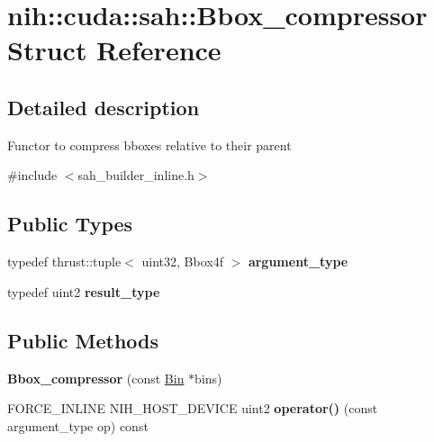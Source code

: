 \hypertarget{structnih_1_1cuda_1_1sah_1_1_bbox__compressor}{}\section{nih\+:\+:cuda\+:\+:sah\+:\+:Bbox\+\_\+compressor Struct Reference}
\label{structnih_1_1cuda_1_1sah_1_1_bbox__compressor}


\subsection{Detailed description}
Functor to compress bboxes relative to their parent 

{\ttfamily \#include $<$sah\+\_\+builder\+\_\+inline.\+h$>$}

\subsection*{Public Types}
\begin{DoxyCompactItemize}
\item 
\mbox{\label{structnih_1_1cuda_1_1sah_1_1_bbox__compressor_a36e40d25f42ea989cd0fa4d2d3c1e13a}} 
typedef thrust\+::tuple$<$ uint32, Bbox4f $>$ {\bfseries argument\+\_\+type}
\item 
\mbox{\label{structnih_1_1cuda_1_1sah_1_1_bbox__compressor_a91750af2676bbb287f94a0d8c66ba078}} 
typedef uint2 {\bfseries result\+\_\+type}
\end{DoxyCompactItemize}
\subsection*{Public Methods}
\begin{DoxyCompactItemize}
\item 
\mbox{\label{structnih_1_1cuda_1_1sah_1_1_bbox__compressor_a0c9a2ee1d40af70f6aef9ee5475f7a90}} 
{\bfseries Bbox\+\_\+compressor} (const \hyperlink{structnih_1_1cuda_1_1sah_1_1_bin}{Bin} $\ast$bins)
\item 
\mbox{\label{structnih_1_1cuda_1_1sah_1_1_bbox__compressor_a7075231eb08cfc8e54f016a3d91217cb}} 
F\+O\+R\+C\+E\+\_\+\+I\+N\+L\+I\+NE N\+I\+H\+\_\+\+H\+O\+S\+T\+\_\+\+D\+E\+V\+I\+CE uint2 {\bfseries operator()} (const argument\+\_\+type op) const
\end{DoxyCompactItemize}
